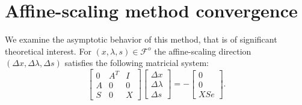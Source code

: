 \documentclass[a4paper,10 pt,titlepage,twoside]{book}
\theoremstyle{plain}
\theoremstyle{definition}
\theoremstyle{remark}
\begin{document}
\section{Affine-scaling method convergence}
We examine the asymptotic behavior of this method, that is of significant theoretical interest.  For $(x, \lambda, s)\in\mathcal{F}^{o}$ the affine-scaling direction $(\Delta x, \Delta \lambda, \Delta s)$ satisfies the following matricial system:\\
\begin{equation}\label{5.1}
\begin{bmatrix}
0&A^{T}&I \\A&0&0\\S&0&X
\end{bmatrix}\begin{bmatrix}
\Delta x\\\Delta\lambda \\\Delta s
\end{bmatrix}=-\begin{bmatrix}
0\\0\\XSe
\end{bmatrix}.
\end{equation}\\
	
\end{document}
